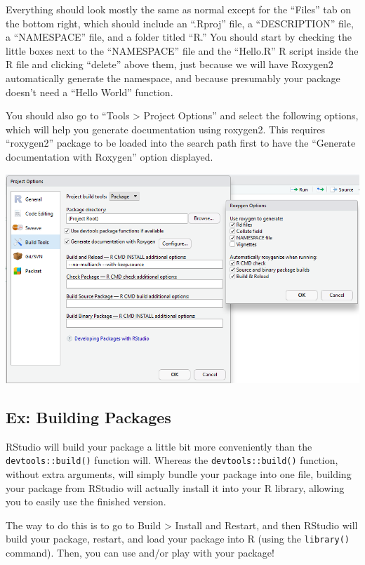 \documentclass[
]{book}
\begin{document}
Everything should look mostly the same as normal except for the ``Files'' tab on the bottom right, which should include an ``.Rproj'' file, a ``DESCRIPTION'' file, a ``NAMESPACE'' file, and a folder titled ``R.'' You should start by checking the little boxes next to the ``NAMESPACE'' file and the ``Hello.R'' R script inside the R file and clicking ``delete'' above them, just because we will have Roxygen2 automatically generate the namespace, and because presumably your package doesn't need a ``Hello World'' function.

You should also go to ``Tools \textgreater{} Project Options'' and select the following options, which will help you generate documentation using roxygen2. This requires ``roxygen2'' package to be loaded into the search path first to have the ``Generate documentation with Roxygen'' option displayed.

\includegraphics{images/packageSS/userox.PNG}

\hypertarget{ex-building-packages}{%
\subsection{Ex: Building Packages}\label{ex-building-packages}}

RStudio will build your package a little bit more conveniently than the \texttt{devtools::build()} function will. Whereas the \texttt{devtools::build()} function, without extra arguments, will simply bundle your package into one file, building your package from RStudio will actually install it into your R library, allowing you to easily use the finished version.

The way to do this is to go to Build \textgreater{} Install and Restart, and then RStudio will build your package, restart, and load your package into R (using the \texttt{library()} command). Then, you can use and/or play with your package!
\end{document}
